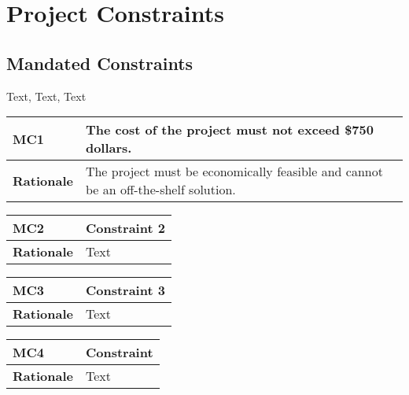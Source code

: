 \documentclass [11pt]{article}
\begin{document}


\section{\textbf{Project Constraints}}

\subsection{Mandated Constraints}
Text, Text, Text

\begin{longtable}{| p{ } | p{ } | }\hline 
\rowcolor{tableCell}\textbf{MC1} & \textbf{The cost of the project must not exceed \$750 dollars.} \\ \hline
\textbf{Rationale} & The project must be economically feasible and cannot be an off-the-shelf solution.\\ \hline 
\end{longtable}

\begin{longtable}{| p{ } | p{ } | }\hline 
\rowcolor{tableCell}\textbf{MC2}& \textbf{Constraint 2}\\ \hline 
\textbf{Rationale} & Text\\ \hline 
\end{longtable}

\begin{longtable}{| p{ } | p{ } | }\hline 
\rowcolor{tableCell}\textbf{MC3} & \textbf{Constraint 3} \\ \hline
\textbf{Rationale} & Text\\ \hline
\end{longtable}

\begin{longtable}{| p{ } | p{ } | }\hline 
\rowcolor{tableCell}\textbf{MC4} & \textbf{Constraint} \\ \hline
\textbf{Rationale} & Text \\ \hline
\end{longtable}
\end{document}
